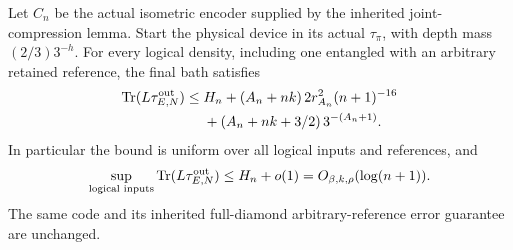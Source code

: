 \begin{lemma}
\label{lem:code-depth}
Let $C_n$ be the actual isometric encoder supplied by the inherited
joint-compression lemma. Start the physical device in its actual
$\tau_\pi$, with depth mass $(2/3)3^{-h}$. For every logical density,
including one entangled with an arbitrary retained reference, the final
bath satisfies
\begin{align}
 \operatorname{Tr}(L\tau_{E,N}^{\rm out})
 \le{}&H_n+(A_n+nk)\,2r_{A_n}^{2}(n+1)^{-16}\notag\\
 &+(A_n+nk+3/2)\,3^{-(A_n+1)}.\label{eq:depth-budget-exact}
\end{align}
In particular the bound is uniform over all logical inputs and references,
and
\[
 \sup_{\text{logical inputs}}\operatorname{Tr}(L\tau_{E,N}^{\rm out})
 \le H_n+o(1)=O_{\beta,k,\rho}(\log(n+1)).
\]
The same code and its inherited full-diamond arbitrary-reference error
guarantee are unchanged.
\end{lemma}
